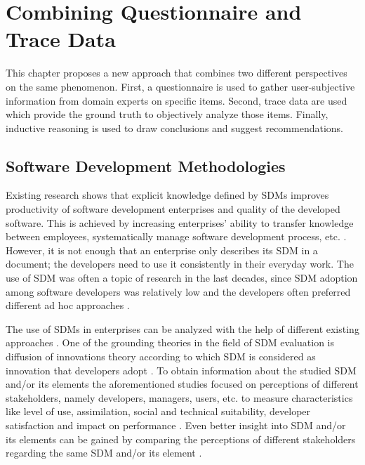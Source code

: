 \chapter{Combining Questionnaire and Trace Data}


This chapter proposes a new approach that combines two different perspectives on the same phenomenon. First, a questionnaire is used to gather user-subjective information from domain experts on specific items. Second, trace data are used which provide the ground truth to objectively analyze those items. Finally, inductive reasoning is used to draw conclusions and suggest recommendations.

\section{Software Development Methodologies}

Existing research shows that explicit knowledge defined by SDMs improves productivity of software development enterprises and quality of the developed software. This is achieved by increasing enterprises’ ability to transfer knowledge between employees, systematically manage software development process, etc. \citep{avison2003information,DBLP:journals/iam/Fitzgerald98,hovelja2015exploring,DBLP:journals/tse/RiemenschneiderHD02}. However, it is not enough that an enterprise only describes its SDM in a document; the developers need to use it consistently in their everyday work. The use of SDM was often a topic of research in the last decades, since SDM adoption among software developers was relatively low and the developers often preferred different ad hoc approaches \citep{DBLP:journals/software/Aaen03,DBLP:journals/isj/Fitzgerald96,DBLP:journals/iam/HuismanI06}. 

The use of SDMs in enterprises can be analyzed with the help of different existing approaches \citep{DBLP:journals/imds/Aboelmaged10,venkatesh2000theoretical,DBLP:journals/behaviourIT/WangLH13}. One of the grounding theories in the field of SDM evaluation is diffusion of innovations theory \citep{rogers2010diffusion} according to which SDM is considered as innovation that developers adopt \citep{DBLP:journals/iam/Gallivan03,DBLP:journals/infsof/GreenHC05,DBLP:conf/caise/IivariH01}. To obtain information about the studied SDM and/or its elements the aforementioned studies focused on perceptions of different stakeholders, namely developers, managers, users, etc. to measure characteristics like level of use, assimilation, social and technical suitability, developer satisfaction and impact on performance \citep{atkinson1999project,cooper1990information,rogers2010diffusion,DBLP:journals/infsof/VavpoticB09,DBLP:journals/comsis/VavpoticH12}. Even better insight into SDM and/or its elements can be gained by comparing the perceptions of different stakeholders regarding the same SDM and/or its element \citep{hovelja2015exploring}. 

